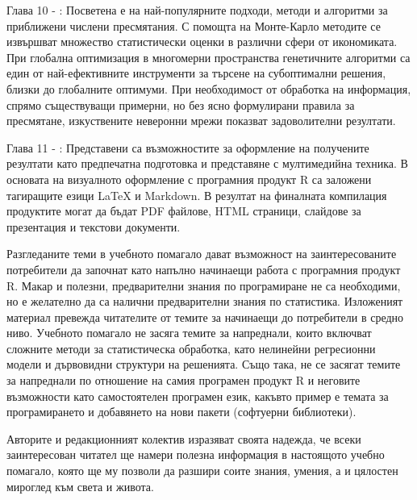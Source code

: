 Глава 10 - : Посветена е на най-популярните подходи, методи и алгоритми за приближени числени пресмятания. С помощта на Монте-Карло методите се извършват множество статистически оценки в различни сфери от икономиката. При глобална оптимизация в многомерни пространства генетичните алгоритми са един от най-ефективните инструменти за търсене на субоптимални решения, близки до глобалните оптимуми. При необходимост от обработка на информация, спрямо съществуващи примерни, но без ясно формулирани правила за пресмятане, изкуствените неверонни мрежи показват задоволителни резултати. 

Глава 11 - : Представени са възможностите за оформление на получените резултати като предпечатна подготовка и представяне с мултимедийна техника. В основата на визуалното оформление с програмния продукт R са заложени тагиращите езици LaTeX и Markdown. В резултат на финалната компилация продуктите могат да бъдат PDF файлове, HTML страници, слайдове за презентация и текстови документи. 

Разгледаните теми в учебното помагало дават възможност на заинтересованите потребители да започнат като напълно начинаещи работа с програмния продукт R. Макар и полезни, предварителни знания по програмиране не са необходими, но е желателно да са налични предварителни знания по статистика. Изложеният материал превежда читателите от темите за начинаещи до потребители в средно ниво. Учебното помагало не засяга темите за напреднали, които включват сложните методи за статистическа обработка, като нелинейни регресионни модели и дървовидни структури на решенията. Също така, не се засягат темите за напреднали по отношение на самия програмен продукт R и неговите възможности като самостоятелен програмен език, какъвто пример е темата за програмирането и добавянето на нови пакети (софтуерни библиотеки). 

Авторите и редакционният колектив изразяват своята надежда, че всеки заинтересован читател ще намери полезна информация в настоящото учебно помагало, която ще му позволи да разшири соите знания, умения, а и цялостен мироглед към света и живота. 

